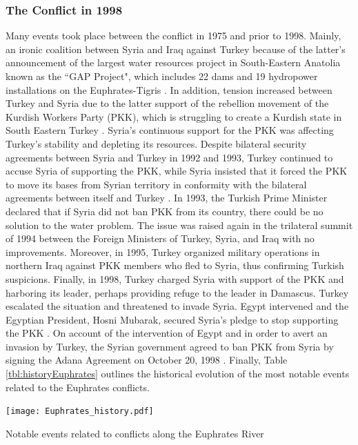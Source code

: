 \documentclass[letterpaper,12pt,titlepage,oneside,final]{book}
\begin{document}
\subsubsection{The Conflict in 1998}
Many events took place between the conflict in 1975 and prior to 1998. Mainly, an ironic coalition between Syria and Iraq against Turkey because of the latter's announcement of the largest water resources project in South-Eastern Anatolia known as the ``GAP Project", which includes 22 dams and 19 hydropower installations on the Euphrates-Tigris \citep{frenken2009irrigation}. In addition, tension increased between Turkey and Syria due to the latter support of the rebellion movement of the Kurdish Workers Party (PKK), which is struggling to create a Kurdish state in South Eastern Turkey \citep{guner1998signalling}. Syria's continuous support for the PKK was affecting Turkey's stability and depleting its resources. Despite bilateral security agreements between Syria and Turkey in 1992 and 1993, Turkey continued to accuse Syria of supporting the PKK, while Syria insisted that it forced the PKK to move its bases from Syrian territory in conformity with the bilateral agreements between itself and Turkey \citep{guner1998signalling}. In 1993, the Turkish Prime Minister declared that if Syria did not ban PKK from its country, there could be no solution to the water problem. The issue was raised again in the trilateral summit of 1994 between the Foreign Ministers of Turkey, Syria, and Iraq with no improvements. Moreover, in 1995, Turkey organized military operations in northern Iraq against PKK members who fled to Syria, thus confirming Turkish suspicions. Finally, in 1998, Turkey charged Syria with support of the PKK and harboring its leader, perhaps providing refuge to the leader in Damascus. Turkey escalated the situation and threatened to invade Syria. Egypt intervened and the Egyptian President, Hosni Mubarak, secured Syria's pledge to stop supporting the PKK \citep{akanda2007tigris}. On account of the intervention of Egypt and in order to avert an invasion by Turkey, the Syrian government agreed to ban PKK from Syria by signing the Adana Agreement on October 20, 1998 \citep{priscoli2009managing}. Finally, Table \ref{tbl:historyEuphrates} outlines the historical evolution of the most notable events related to the Euphrates conflicts.

\begin{table}[H]
\centering
\texttt{[image: Euphrates\_history.pdf]}

\caption{Notable events related to conflicts along the Euphrates River}

\label{tbl:historyEuphrates}
\end{table}
\end{document}
